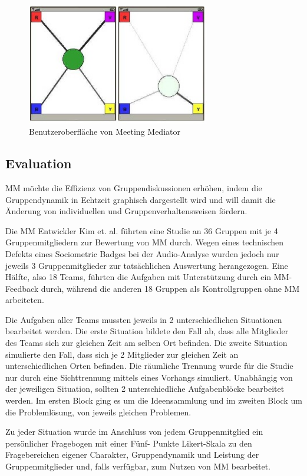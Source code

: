 \begin{figure}[htp] 
\centering 
\includegraphics[width=8cm]{mm.jpg}
\caption{Benutzeroberfläche von Meeting Mediator
\protect\cite{KimChaHolPent2008}}
\label{display}
\end{figure}


\subsection{Evaluation}
MM möchte die Effizienz von Gruppendiskussionen er\-höh\-en, indem die
Gruppendynamik in Echtzeit graphisch dargestellt wird und will damit die Änderung
von individuellen und Gruppenverhaltensweisen fördern.
 
Die MM Entwickler Kim et. al. führten eine Studie \cite{KimChaHolPent2008} an 36
Gruppen mit je 4 Gruppenmitgliedern zur Bewertung von MM durch. Wegen eines
technischen Defekts eines Sociometric Badges bei der Audio-Analyse wurden
jedoch nur jeweils 3 Gruppenmitglieder zur tatsächlichen Auswertung
herangezogen.
Eine Hälfte, also 18 Teams, führten die Aufgaben mit Unterstützung durch ein
MM-Feedback durch, während die anderen 18 Gruppen als Kontrollgruppen ohne MM
arbeiteten.

Die Aufgaben aller Teams mussten jeweils in 2 unterschiedlichen Situationen
bearbeitet werden.
Die erste Situation bildete den Fall ab, dass alle Mitglieder des Teams sich zur
gleichen Zeit am selben Ort befinden. Die zweite Situation simulierte den Fall,
dass sich je 2 Mitglieder zur gleichen Zeit an unterschiedlichen Orten
befinden.
Die räumliche Trennung wurde für die Studie nur durch eine Sichttrennung mittels
eines Vorhangs simuliert.
Unabhängig von der jeweiligen Situation, sollten 2 unterschiedliche
Aufgabenblöcke bearbeitet werden. Im ersten Block ging es um die Ideensammlung
und im zweiten Block um die Pro\-blem\-lö\-sung, von jeweils gleichen Problemen.

Zu jeder Situation wurde im Anschluss von jedem Gruppenmitglied ein persönlicher
Fragebogen mit einer Fünf- Punkte Likert-Skala \cite{WP_Likert} zu den Fragebereichen eigener
Charakter, Gruppendynamik und Leistung der Gruppenmitglieder und, falls
verfügbar, zum Nutzen von MM bearbeitet.
 
